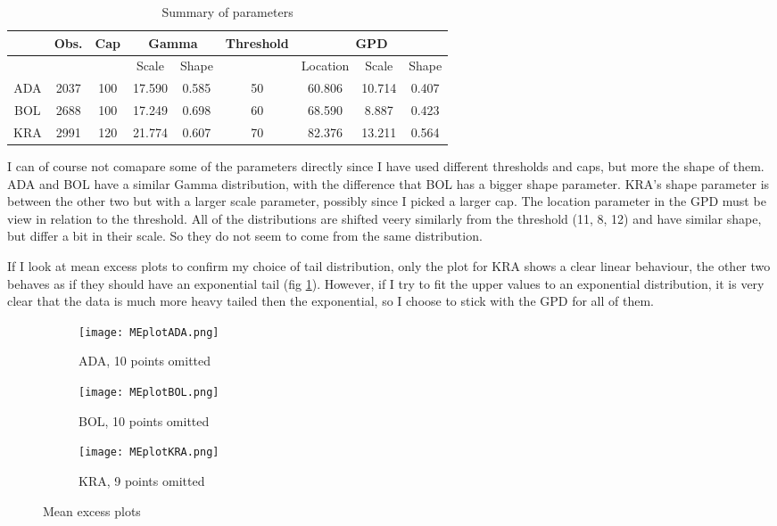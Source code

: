 \documentclass{article}
\begin{document}
	\begin{table}[H]
		\centering
		\begin{tabular}{| c | c | c | c | c | c | c | c | c |}
			\hline
		 	& Obs. & Cap & \multicolumn{2}{|c|}{Gamma} & Threshold & \multicolumn{3}{|c|}{GPD} \\
		 	\hline
		 	 & & & Scale & Shape & & Location & Scale & Shape \\
		  	\hline
		  	ADA & 2037 & 100 & 17.590 & 0.585 & 50 & 60.806 & 10.714 & 0.407 \\
		 	 \hline
		 	 BOL & 2688 & 100 & 17.249 & 0.698 & 60 & 68.590 & 8.887 & 0.423 \\
		 	 \hline
		 	 KRA & 2991 & 120 & 21.774 & 0.607 & 70 & 82.376 & 13.211 & 0.564 \\
		  	\hline
		 \end{tabular}	
		\caption{Summary of parameters}
		\label{tablepara}
	\end{table}	
	I can of course not comapare some of the parameters directly since I have used different thresholds and caps, but more the shape of them. ADA and BOL have a similar Gamma distribution, with the difference that BOL has a bigger shape parameter. KRA's shape parameter is between the other two but with a larger scale parameter, possibly since I picked a larger cap. The location parameter in the GPD must be view in relation to the threshold. All of the distributions are shifted veery similarly from the threshold (11, 8, 12) and have similar shape, but differ a bit in their scale. So they do not seem to come from the same distribution. 
	
	If I look at mean excess plots to confirm my choice of tail distribution, only the plot for KRA shows a clear linear behaviour, the other two behaves as if they should have an exponential tail (fig \ref{MeanEplot}). However, if I try to fit the upper values to an exponential distribution, it is very clear that the data is much more heavy tailed then the exponential, so I choose to stick with the GPD for all of them.
	\begin{figure}[H]
		\centering
		\begin{subfigure}{0.5\textwidth}
			\centering
			\texttt{[image: MEplotADA.png]}
			\caption{ADA, 10 points omitted}
		\end{subfigure}%
		\begin{subfigure}{0.5\textwidth}
			\centering
			\texttt{[image: MEplotBOL.png]}
			\caption{BOL, 10 points omitted}
		\end{subfigure}
		\begin{subfigure}{0.5\textwidth}
			\centering
			\texttt{[image: MEplotKRA.png]}
			\caption{KRA, 9 points omitted}
		\end{subfigure}
		\caption{Mean excess plots}
		\label{MeanEplot}
	\end{figure}
	
\end{document}
